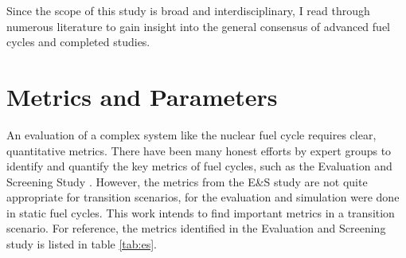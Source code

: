 
Since the scope of this study is broad and interdisciplinary,
I read through numerous literature to gain insight into the
general consensus of advanced fuel cycles and completed studies.


\section{Metrics and Parameters}

An evaluation of a complex system like the nuclear fuel cycle
requires clear, quantitative metrics.
There have been many honest efforts by expert groups
to identify and quantify the key metrics of fuel cycles,
 such as the Evaluation and Screening Study
\cite{wigeland_nuclear_2014}. However, the metrics from the E\&S study
are not quite appropriate for transition scenarios, for the evaluation and simulation
were done in static fuel cycles. This work intends to find important
metrics in a transition scenario.
For reference, the metrics
identified in the Evaluation and Screening study is listed in
table \ref{tab:es}.

